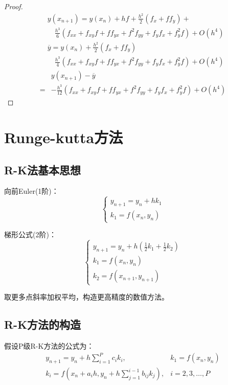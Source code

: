 \documentclass{article}
\begin{document}
\begin{proof}
    \begin{equation*}
        \begin{split}
            &y(x_{n+1})=y(x_n)+hf+\frac{h^2}{2}(f_x+ff_y)+ \\
            &\quad \frac{h^3}{6}(f_{xx} + f_{xy}f + ff_{yx}+f^2f_{yy}+f_yf_x+f^2_yf) + O(h^4)
        \end{split}
    \end{equation*}
    \begin{equation*}
        \begin{split}
            &\overline{y} = y(x_n) + \frac{h^2}{2}(f_x+ff_y) \\
            &\quad \frac{h^3}{4}(f_{xx} + f_{xy}f + ff_{yx}+f^2f_{yy}+f_yf_x+f^2_yf) + O(h^4)
        \end{split}
    \end{equation*}
    \begin{align*}
        &y(x_{n+1}) - \overline{y} \\
        =& -\frac{h^3}{12}(f_{xx} + f_{xy}f + ff_{yx}+f^2f_{yy}+f_yf_x+f^2_yf) + O(h^4)
    \end{align*}
\end{proof}

\section{Runge-kutta方法}
\subsection{R-K法基本思想}
向前Euler(1阶)：
$$
\left\{
\begin{array}{lr}
    y_{n+1} = y_n+hk_1\\
    k_1=f(x_n, y_n)
\end{array}\right.
$$

梯形公式(2阶)：
$$
\left\{
\begin{array}{lr}
    y_{n+1} = y_n + h(\frac{1}{2}k_1+\frac{1}{2}k_2)\\
    k_1 = f(x_n, y_n)\\
    k_2 = f(x_{n+1}, y_{n+1})
\end{array}\right.
$$

取更多点斜率加权平均，构造更高精度的数值方法。

\subsection{R-K方法的构造}
假设P级R-K方法的公式为：
\begin{equation}
\begin{array}{lr}
    y_{n+1} = y_n +h\sum^P_{i=1}c_ik_i, &k_1=f(x_n,y_n)\\
    k_i = f(x_n+a_ih, y_n+h\sum^{i-1}_{j=1}b_{ij}k_j), & i=2,3,\dots, P 
\end{array}
\end{equation}
\end{document}
